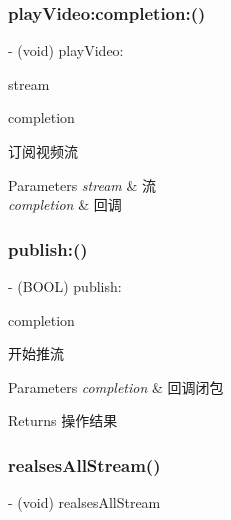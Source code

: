 \subsubsection{\texorpdfstring{play\+Video\+:completion\+:()}{playVideo:completion:()}}
{\footnotesize\ttfamily -\/ (void) play\+Video\+: \begin{DoxyParamCaption}\item[{(\hyperlink{interface_c_c_stream}{C\+C\+Stream} $\ast$)}]{stream }\item[{completion:(C\+C\+Comletion\+Block)}]{completion }\end{DoxyParamCaption}}

订阅视频流 
\begin{DoxyParams}{Parameters}
{\em stream} & 流 \\
\hline
{\em completion} & 回调 \\
\hline
\end{DoxyParams}
\mbox{\label{interface_c_c_streamer_basic_a2a7f9c89eb1279f7bde5f664e333e935}} 
\subsubsection{\texorpdfstring{publish\+:()}{publish:()}}
{\footnotesize\ttfamily -\/ (B\+O\+OL) publish\+: \begin{DoxyParamCaption}\item[{(C\+C\+Comletion\+Block)}]{completion }\end{DoxyParamCaption}}

开始推流 
\begin{DoxyParams}{Parameters}
{\em completion} & 回调闭包 \\
\hline
\end{DoxyParams}
\begin{DoxyReturn}{Returns}
操作结果 
\end{DoxyReturn}
\mbox{\label{interface_c_c_streamer_basic_a1023b14df6914c3190d89c5cddbea14c}} 
\subsubsection{\texorpdfstring{realses\+All\+Stream()}{realsesAllStream()}}
{\footnotesize\ttfamily -\/ (void) realses\+All\+Stream \begin{DoxyParamCaption}{ }\end{DoxyParamCaption}}

